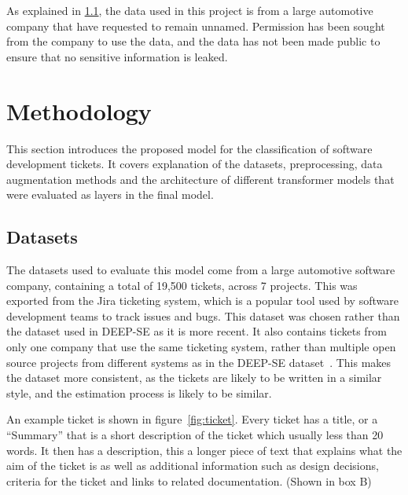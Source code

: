 \documentclass{UoYCSproject}
\begin{document}
    As explained in \ref{sec:datasets}, the data used in this project is from a large automotive company that have requested to remain unnamed.
    Permission has been sought from the company to use the data, and the data has not been made public to ensure that no sensitive information is leaked.


    \chapter{Methodology}
    \label{ch:methodology}
    This section introduces the proposed model for the classification of software development tickets.
    It covers explanation of the datasets, preprocessing, data augmentation methods and the architecture of different transformer models that were evaluated as layers in the final model.

    \section{Datasets}\label{sec:datasets}
    The datasets used to evaluate this model come from a large automotive software company, containing a total of 19,500 tickets, across 7 projects.
    This was exported from the Jira ticketing system, which is a popular tool used by software development teams to track issues and bugs.
    This dataset was chosen rather than the dataset used in DEEP-SE as it is more recent.
    It also contains tickets from only one company that use the same ticketing system, rather than multiple open source projects from different systems as in the DEEP-SE dataset~\cite{8255666}. This makes the dataset more consistent, as the tickets are likely to be written in a similar style, and the estimation process is likely to be similar. \par
    An example ticket is shown in figure~\ref{fig:ticket}.
    Every ticket has a title, or a ``Summary'' that is a short description of the ticket which usually less than 20 words.
    It then has a description, this a longer piece of text that explains what the aim of the ticket is as well as additional information such as design decisions, criteria for the ticket and links to related documentation. (Shown in box B) \par
\end{document}
